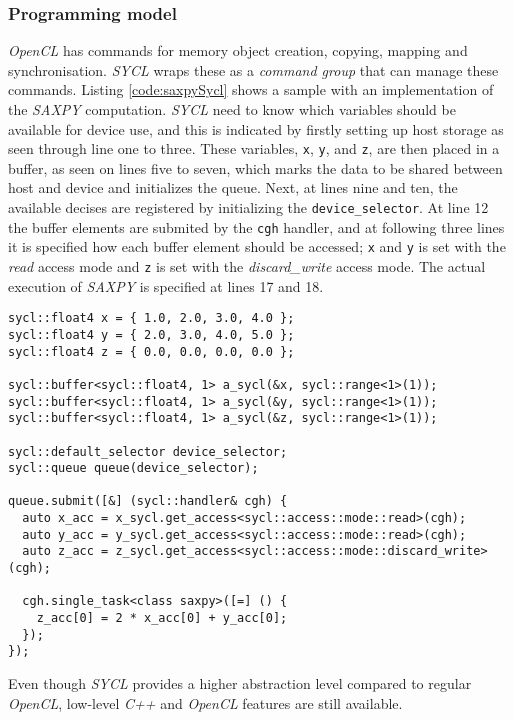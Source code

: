 \subsubsection{Programming model}
\textit{OpenCL} has commands for memory object creation, copying, mapping and synchronisation. \textit{SYCL} wraps these as a \textit{command group} that can manage these commands. Listing \ref{code:saxpySycl} shows a sample with an implementation of the \textit{SAXPY} computation. \textit{SYCL} need to know which variables should be available for device use, and this is indicated by firstly setting up host storage as seen through line one to three. These variables, \texttt{x}, \texttt{y}, and \texttt{z}, are then placed in a buffer, as seen on lines five to seven, which marks the data to be shared between host and device and initializes the queue. Next, at lines nine and ten, the available decises are registered by initializing the \texttt{device\_selector}. At line 12 the buffer elements are submited by the \texttt{cgh} handler, and at following three lines it is specified how each buffer element should be accessed; \texttt{x} and \texttt{y} is set with the \textit{read} access mode and \texttt{z} is set with the \textit{discard\_write} access mode. The actual execution of \textit{SAXPY} is specified at lines 17 and 18.

\begin{lstlisting}[caption={\textit{SAXPY} implemented in \textit{SYCL}.}, label={code:saxpySycl}]
sycl::float4 x = { 1.0, 2.0, 3.0, 4.0 };
sycl::float4 y = { 2.0, 3.0, 4.0, 5.0 };
sycl::float4 z = { 0.0, 0.0, 0.0, 0.0 };

sycl::buffer<sycl::float4, 1> a_sycl(&x, sycl::range<1>(1));
sycl::buffer<sycl::float4, 1> a_sycl(&y, sycl::range<1>(1));
sycl::buffer<sycl::float4, 1> a_sycl(&z, sycl::range<1>(1));

sycl::default_selector device_selector;
sycl::queue queue(device_selector);

queue.submit([&] (sycl::handler& cgh) {
  auto x_acc = x_sycl.get_access<sycl::access::mode::read>(cgh);
  auto y_acc = y_sycl.get_access<sycl::access::mode::read>(cgh);
  auto z_acc = z_sycl.get_access<sycl::access::mode::discard_write>(cgh);

  cgh.single_task<class saxpy>([=] () {
    z_acc[0] = 2 * x_acc[0] + y_acc[0];
  });
});
\end{lstlisting}

Even though \textit{SYCL} provides a higher abstraction level compared to regular \textit{OpenCL}, low-level \textit{C++} and \textit{OpenCL} features are still available.

